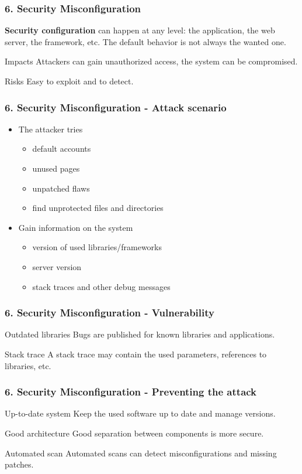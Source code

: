 \begin{frame}
\frametitle{6. Security Misconfiguration}
\textbf{Security configuration} can happen at any level: the application, the
web server, the framework, etc.
The default behavior is not always the wanted one.
\begin{block}{Impacts}
Attackers can gain unauthorized access, the system can be compromised.
\end{block}
\begin{block}{Risks}
\alert{Easy} to exploit and to detect.
\end{block}
\end{frame}

\begin{frame}
\frametitle{6. Security Misconfiguration - Attack scenario}
\begin{itemize}
\item The attacker tries
	\begin{itemize}
	\item default accounts
	\item unused pages
	\item unpatched flaws
	\item find unprotected files and directories
	\end{itemize}
\item Gain information on the system
	\begin{itemize}
	\item version of used libraries/frameworks
	\item server version
	\item stack traces and other debug messages
	\end{itemize}
\end{itemize}
\end{frame}

\begin{frame}
\frametitle{6. Security Misconfiguration - Vulnerability}
\begin{block}{Outdated libraries}
Bugs are published for known libraries and applications.
\end{block}
\begin{exampleblock}{Stack trace}
A stack trace may contain the used parameters, references to libraries, etc.
\end{exampleblock}
\end{frame}

\begin{frame}
\frametitle{6. Security Misconfiguration - Preventing the attack}
\begin{block}{Up-to-date system}
Keep the used software up to date and manage versions.
\end{block}
\begin{block}{Good architecture}
Good separation between components is more secure.
\end{block}
\begin{block}{Automated scan}
Automated scans can detect misconfigurations and missing patches.
\end{block}
\end{frame}

